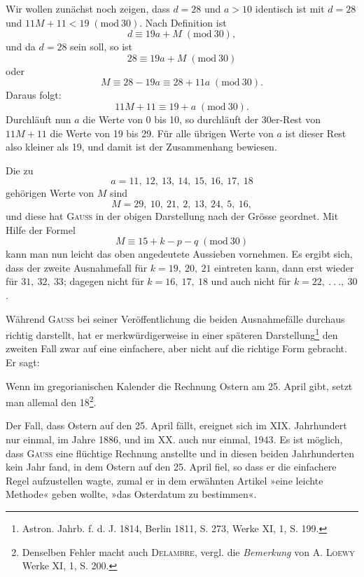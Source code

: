 Wir wollen zunächst noch zeigen, dass $d=28$ und $a>10$ identisch ist
mit $d=28$ und $11M+11<19\; (\mathrm{mod}\ 30)$.
\clearpage{}
\setcounter{footnote}{0}
\noindent\hspace*{\parindent}Nach Definition ist
\[
d\equiv19a+M\; (\mathrm{mod}\ 30),
\]
\noindent und da $d=28$ sein soll, so ist
\[
28\equiv19a+M\; (\mathrm{mod}\ 30)
\]
\noindent oder
\[
M\equiv28-19a\equiv28+11a\; (\mathrm{mod}\ 30).
\]
\noindent Daraus folgt:
\[
11M+11\equiv19+a\; (\mathrm{mod}\ 30).
\]
\noindent Durchläuft nun $a$ die Werte von 0 bis 10, so durchläuft der 30er-Rest von
$11M+11$ die Werte von 19 bis 29. Für alle übrigen Werte von $a$ ist dieser
Rest also kleiner als 19, und damit ist der Zusammenhang bewiesen.

Die zu
\[
a=11,\ 12,\ 13,\ 14,\ 15,\ 16,\ 17,\ 18
\]
\noindent gehörigen Werte von $M$ sind
\[
M=29,\ 10,\ 21,\ 2,\ 13,\ 24,\ 5,\ 16,
\]
\noindent und diese hat \textsc{Gauss} in der obigen Darstellung nach der Grösse geordnet.
Mit Hilfe der Formel
\[
M\equiv15+k-p-q\; (\mathrm{mod}\ 30)
\]
\noindent kann man nun leicht das oben angedeutete Aussieben vornehmen. Es ergibt
sich, dass der zweite Ausnahmefall für $k=19,\ 20,\ 21$ eintreten kann, dann
erst wieder für $31,\ 32,\ 33$; dagegen nicht für $k=16,\ 17,\ 18$ und auch nicht
für $k=22,\ .\ .\ .,\ 30$.

Während \textsc{Gauss} bei seiner  Veröffentlichung die beiden Ausnahmefälle durchaus richtig darstellt, hat er merkwürdigerweise in einer späteren
Darstellung\footnote{Astron. Jahrb. f. d. J. 1814, Berlin 1811, S. 273, Werke XI, 1, S. 199.} den zweiten Fall zwar auf eine einfachere, aber nicht auf die
richtige Form gebracht. Er sagt:

Wenn im gregorianischen Kalender die Rechnung Ostern am 25. April
gibt, setzt man allemal den 18\footnote{Denselben Fehler macht auch \textsc{Delambre}, vergl. die \textit{Bemerkung} von A. \textsc{Loewy} Werke XI, 1, S. 200.}.

Der Fall, dass Ostern auf den 25. April fällt, ereignet sich im XIX. Jahrhundert nur einmal, im Jahre 1886, und im XX. auch nur einmal, 1943.
\clearpage{}
\setcounter{footnote}{0}
\noindent Es ist möglich, dass \textsc{Gauss} eine flüchtige Rechnung anstellte und in diesen
beiden Jahrhunderten kein Jahr fand, in dem Ostern auf den 25. April fiel,
so dass er die einfachere Regel aufzustellen wagte, zumal er in dem erwähnten
Artikel »eine leichte Methode« geben wollte, »das Osterdatum zu bestimmen«.


